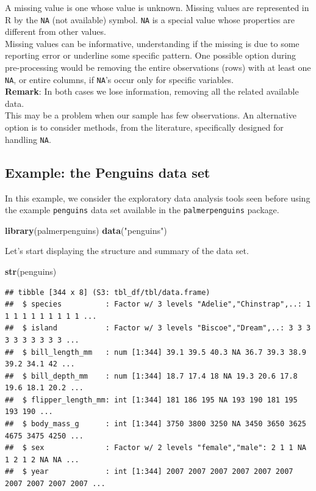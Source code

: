 \documentclass[
]{article}
\newenvironment{Shaded}{\begin{snugshade}}{\end{snugshade}}
\newcommand{\FunctionTok}[1]{\textcolor[rgb]{0.13,0.29,0.53}{\textbf{#1}}}
\newcommand{\NormalTok}[1]{#1}
\newcommand{\StringTok}[1]{\textcolor[rgb]{0.31,0.60,0.02}{#1}}
\begin{document}
A missing value is one whose value is unknown. Missing values are
represented in R by the \texttt{NA} (not available) symbol. \texttt{NA}
is a special value whose properties are different from other values.\\
Missing values can be informative, understanding if the missing is due
to some reporting error or underline some specific pattern. One possible
option during pre-processing would be removing the entire observations
(rows) with at least one \texttt{NA}, or entire columns, if
\texttt{NA}'s occur only for specific variables.\\
\textbf{Remark}: In both cases we lose information, removing all the
related available data.\\
This may be a problem when our sample has few observations. An
alternative option is to consider methods, from the literature,
specifically designed for handling \texttt{NA}.

\hypertarget{example-the-penguins-data-set}{%
\subsection{Example: the Penguins data
set}\label{example-the-penguins-data-set}}

In this example, we consider the exploratory data analysis tools seen
before using the example \texttt{penguins} data set available in the
\texttt{palmerpenguins} package.

\begin{Shaded}
\begin{Highlighting}[]
\FunctionTok{library}\NormalTok{(palmerpenguins)}
\FunctionTok{data}\NormalTok{(}\StringTok{"penguins"}\NormalTok{)}
\end{Highlighting}
\end{Shaded}

Let's start displaying the structure and summary of the data set.

\begin{Shaded}
\begin{Highlighting}[]
\FunctionTok{str}\NormalTok{(penguins)}
\end{Highlighting}
\end{Shaded}

\begin{verbatim}
## tibble [344 x 8] (S3: tbl_df/tbl/data.frame)
##  $ species          : Factor w/ 3 levels "Adelie","Chinstrap",..: 1 1 1 1 1 1 1 1 1 1 ...
##  $ island           : Factor w/ 3 levels "Biscoe","Dream",..: 3 3 3 3 3 3 3 3 3 3 ...
##  $ bill_length_mm   : num [1:344] 39.1 39.5 40.3 NA 36.7 39.3 38.9 39.2 34.1 42 ...
##  $ bill_depth_mm    : num [1:344] 18.7 17.4 18 NA 19.3 20.6 17.8 19.6 18.1 20.2 ...
##  $ flipper_length_mm: int [1:344] 181 186 195 NA 193 190 181 195 193 190 ...
##  $ body_mass_g      : int [1:344] 3750 3800 3250 NA 3450 3650 3625 4675 3475 4250 ...
##  $ sex              : Factor w/ 2 levels "female","male": 2 1 1 NA 1 2 1 2 NA NA ...
##  $ year             : int [1:344] 2007 2007 2007 2007 2007 2007 2007 2007 2007 2007 ...
\end{verbatim}
\end{document}
